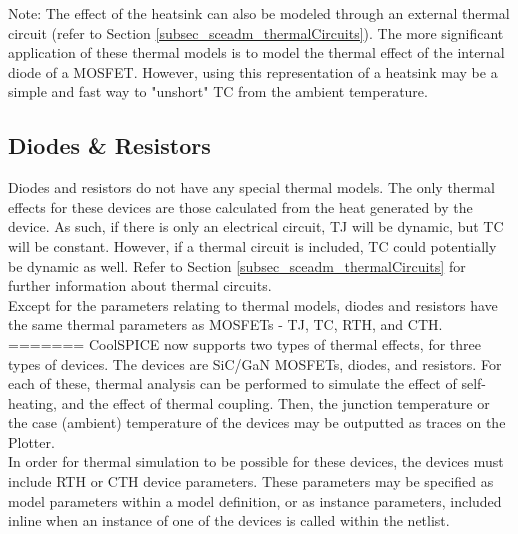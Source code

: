 Note: The effect of the heatsink can also be modeled through an external thermal circuit (refer to Section \ref{subsec_sceadm_thermalCircuits}). The more significant application of these thermal models is to model the thermal effect of the internal diode of a MOSFET. However, using this representation of a heatsink may be a simple and fast way to "unshort" TC from the ambient temperature.

\subsection{Diodes \& Resistors}
\label{subsec_sceadm_thermalDioAndRes}

Diodes and resistors do not have any special thermal models. The only thermal effects for these devices are those calculated from the heat generated by the device. As such, if there is only an electrical circuit, TJ will be dynamic, but TC will be constant. However, if a thermal circuit is included, TC could potentially be dynamic as well. Refer to Section \ref{subsec_sceadm_thermalCircuits} for further information about thermal circuits. \\

Except for the parameters relating to thermal models, diodes and resistors have the same thermal parameters as MOSFETs - TJ, TC, RTH, and CTH.
=======
CoolSPICE now supports two types of thermal effects, for three types of devices. The devices are SiC/GaN MOSFETs, diodes, and resistors. 
For each of these, thermal analysis can be performed to simulate the effect of self-heating, and the effect of thermal coupling. 
Then, the junction temperature or the case (ambient) temperature of the devices may be outputted as traces on the Plotter. \\

In order for thermal simulation to be possible for these devices, the devices must include RTH or CTH device parameters. These parameters may 
be specified as model parameters within a model definition, or as instance parameters, included inline when an instance of one of the devices
is called within the netlist. \\

